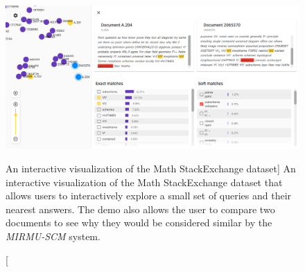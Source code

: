 \begin{figure}
\includegraphics{document-maps}
\caption
  [An interactive visualization of the Math StackExchange dataset]%
  {An interactive visualization of the Math StackExchange dataset
   that allows users to interactively explore a small set of queries
   and their nearest answers. The demo also allows the user to
   compare two documents to see why they would be considered similar
   by the \emph{MIRMU-SCM} system. \cite[Figure 3]{novotny2021ensembling}}
\label{fig:document-maps}
\end{figure}